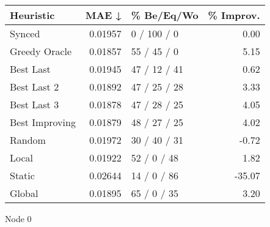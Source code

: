 \begin{tabular}{lrlr}
\toprule
\textbf{Heuristic} & \textbf{MAE ↓} & \textbf{\% Be/Eq/Wo} & \textbf{\% Improv.} \\
\midrule
            Synced &        0.01957 &          0 / 100 / 0 &                0.00 \\
     Greedy Oracle &        0.01857 &          55 / 45 / 0 &                5.15 \\
         Best Last &        0.01945 &         47 / 12 / 41 &                0.62 \\
       Best Last 2 &        0.01892 &         47 / 25 / 28 &                3.33 \\
       Best Last 3 &        0.01878 &         47 / 28 / 25 &                4.05 \\
    Best Improving &        0.01879 &         48 / 27 / 25 &                4.02 \\
            Random &        0.01972 &         30 / 40 / 31 &               -0.72 \\
             Local &        0.01922 &          52 / 0 / 48 &                1.82 \\
            Static &        0.02644 &          14 / 0 / 86 &              -35.07 \\
            Global &        0.01895 &          65 / 0 / 35 &                3.20 \\
\bottomrule
\end{tabular}
\caption{Node 0}
\label{tab:iid_lr01_le2_bs2_0}
